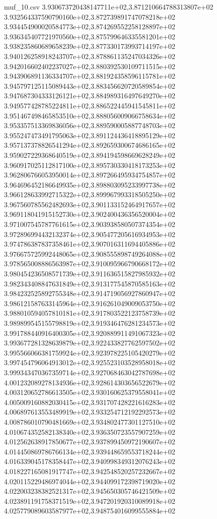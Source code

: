\begin{filecontents*}{muf_10.csv}
3.930673720438147711e+02,3.871210664788313807e+02
3.932564337590790160e+02,3.872739891747078218e+02
3.934454900020584773e+02,3.874269552258128897e+02
3.936345407721970560e+02,3.875799646335581201e+02
3.938235860689658239e+02,3.877330173993714197e+02
3.940126258918243707e+02,3.878861135247034326e+02
3.942016602402237027e+02,3.880392530109711515e+02
3.943906891136334707e+02,3.881924358596115781e+02
3.945797125115089443e+02,3.883456620720589854e+02
3.947687304333126121e+02,3.884989316497649270e+02
3.949577428785224811e+02,3.886522445941545811e+02
3.951467498465853510e+02,3.888056009066758634e+02
3.953357513369836056e+02,3.889590005887748703e+02
3.955247473491795063e+02,3.891124436418895129e+02
3.957137378826541294e+02,3.892659300674686165e+02
3.959027229368640519e+02,3.894194598669628249e+02
3.960917025112817100e+02,3.895730330418173253e+02
3.962806766053950014e+02,3.897266495934754857e+02
3.964696452186649935e+02,3.898803095233997738e+02
3.966128633992715322e+02,3.899967993318505250e+02
3.967560785562482693e+02,3.901133152464917657e+02
3.969118041915152730e+02,3.902400436356520004e+02
3.971007545787761615e+02,3.903938580507374354e+02
3.972896994432132374e+02,3.905477205616934953e+02
3.974786387837358461e+02,3.907016311694405886e+02
3.976675725992448065e+02,3.908555898749264088e+02
3.978565008886563987e+02,3.910095966790668172e+02
3.980454236508571739e+02,3.911636515827985932e+02
3.982343408847631849e+02,3.913177545870585163e+02
3.984232525892755348e+02,3.914719056927860947e+02
3.986121587633145964e+02,3.916261049009053750e+02
3.988010594057810181e+02,3.917803522123758739e+02
3.989899545155798819e+02,3.919346476281234573e+02
3.991788440916400305e+02,3.920889911491067323e+02
3.993677281328639879e+02,3.922433827762597502e+02
3.995566066381759924e+02,3.923978225105420279e+02
3.997454796064913012e+02,3.925523103528958018e+02
3.999343470367359714e+02,3.927068463042787698e+02
4.001232089278134936e+02,3.928614303656522679e+02
4.003120652786613505e+02,3.930160625379558041e+02
4.005009160882030415e+02,3.931707428221616283e+02
4.006897613553489919e+02,3.933254712192292573e+02
4.008786010790481669e+02,3.934802477301127510e+02
4.010674352582138340e+02,3.936350723557907259e+02
4.012562638917850677e+02,3.937899450972190607e+02
4.014450869786766134e+02,3.939448659553718244e+02
4.016339045178358447e+02,3.940998349312076243e+02
4.018227165081917747e+02,3.942548520257232667e+02
4.020115229486974044e+02,3.944099172398719020e+02
4.022003238382521317e+02,3.945650305746421509e+02
4.023891191758371519e+02,3.947201920310089918e+02
4.025779089603587977e+02,3.948754016099555884e+02

\end{filecontents*}
